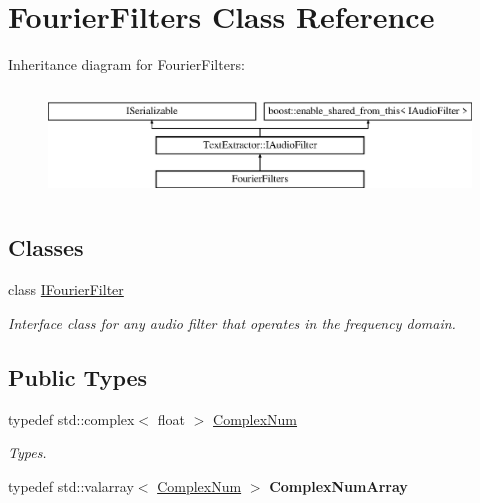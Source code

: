\hypertarget{class_fourier_filters}{}\section{Fourier\+Filters Class Reference}
\label{class_fourier_filters}
Inheritance diagram for Fourier\+Filters\+:\begin{figure}[H]
\begin{center}
\leavevmode
\includegraphics[height=2.926829cm]{class_fourier_filters}
\end{center}
\end{figure}
\subsection*{Classes}
\begin{DoxyCompactItemize}
\item 
class \hyperlink{class_fourier_filters_1_1_i_fourier_filter}{I\+Fourier\+Filter}
\begin{DoxyCompactList}\small\item\em Interface class for any audio filter that operates in the frequency domain. \end{DoxyCompactList}\end{DoxyCompactItemize}
\subsection*{Public Types}
\begin{DoxyCompactItemize}
\item 
\mbox{\label{class_fourier_filters_a5ef63b00a3f87418e214e3ca254cb2d7}} 
typedef std\+::complex$<$ float $>$ \hyperlink{class_fourier_filters_a5ef63b00a3f87418e214e3ca254cb2d7}{Complex\+Num}
\begin{DoxyCompactList}\small\item\em Types. \end{DoxyCompactList}\item 
\mbox{\label{class_fourier_filters_a0c1dda206fd4fb5648ef03533562f804}} 
typedef std\+::valarray$<$ \hyperlink{class_fourier_filters_a5ef63b00a3f87418e214e3ca254cb2d7}{Complex\+Num} $>$ {\bfseries Complex\+Num\+Array}
\end{DoxyCompactItemize}
